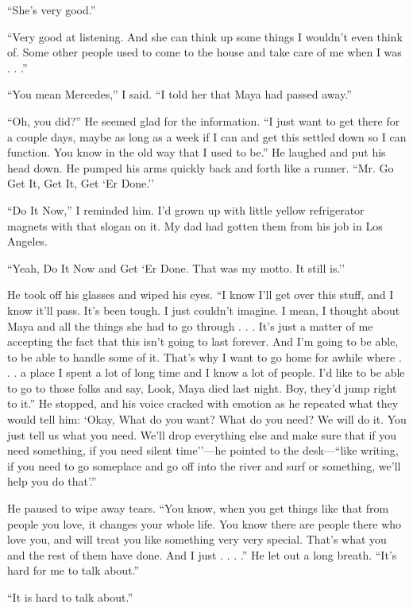 \documentclass[12pt]{book}
\begin{document}
``She's very good.''

``Very good at listening. And she can think up some things I wouldn't even think of. Some other people used to come to the house and take care of me when I was . . .''

``You mean Mercedes,'' I said. ``I told her that Maya had passed away.''

``Oh, you did?'' He seemed glad for the information. ``I just want to get there for a couple days, maybe as long as a week if I can and get this settled down so I can function. You know in the old way that I used to be.'' He laughed and put his head down. He pumped his arms quickly back and forth like a runner. ``Mr. Go Get It, Get It, Get `Er Done.''

``Do It Now,'' I reminded him. I'd grown up with little yellow refrigerator magnets with that slogan on it. My dad had gotten them from his job in Los Angeles.

``Yeah, Do It Now and Get `Er Done. That was my motto. It still is.''

He took off his glasses and wiped his eyes. ``I know I'll get over this stuff, and I know it'll pass. It's been tough. I just couldn't imagine. I mean, I thought about Maya and all the things she had to go through . . . It's just a matter of me accepting the fact that this isn't going to last forever. And I'm going to be able, to be able to handle some of it. That's why I want to go home for awhile where . . . a place I spent a lot of long time and I know a lot of people. I'd like to be able to go to those folks and say, Look, Maya died last night. Boy, they'd jump right to it.'' He stopped, and his voice cracked with emotion as he repeated what they would tell him: `Okay, What do you want? What do you need? We will do it. You just tell us what you need. We'll drop everything else and make sure that if you need something, if you need silent time''---he pointed to the desk---``like writing, if you need to go someplace and go off into the river and surf or something, we'll help you do that'.''

He paused to wipe away tears. ``You know, when you get things like that from people you love, it changes your whole life. You know there are people there who love you, and will treat you like something very very special. That's what you and the rest of them have done. And I just . . . .'' He let out a long breath. ``It's hard for me to talk about.''

``It is hard to talk about.''
\end{document}
